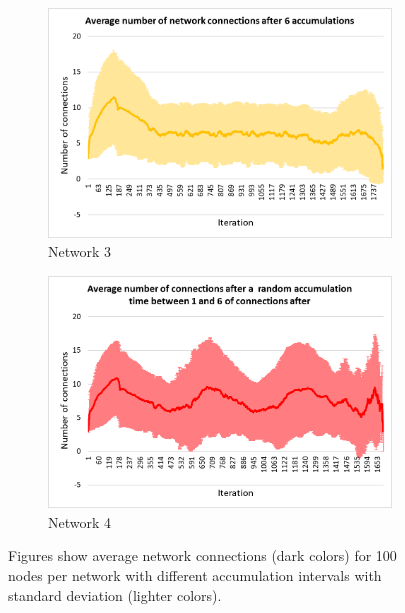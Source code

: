 \documentclass[USenglish]{uit-thesis}
\begin{document}
\begin{figure} [ht]
\begin{subfigure}[b]{0.475\textwidth}
            \includegraphics[width=\textwidth]{numConn_stdev_6.png}
            \caption[]%
            {{\small Network 3}}    
            \label{fig:connfig3}
        \end{subfigure}
        \quad
        \begin{subfigure}[b]{0.475\textwidth}   
            \centering 
            \includegraphics[width=\textwidth]{numConn_stdev_rand.png}
            \caption[]%
            {{\small Network 4}}    
            \label{fig:connfig4}
        \end{subfigure}
        \caption[Figures show average network connections for 100 nodes per network with different accumulation intervals with standard deviation (lighter colors).]
        {\small Figures show average network connections (dark colors) for 100 nodes per network with different accumulation intervals with standard deviation (lighter colors).} 
        \label{fig:netconnChart}
    \end{figure}
    
\end{document}
